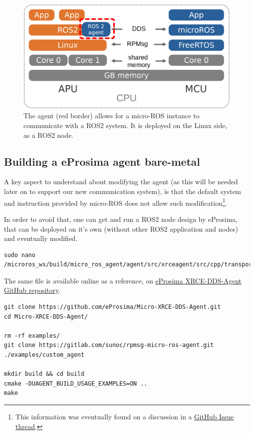\documentclass[10pt]{article}
\begin{document}
\begin{figure}[htbp]
\centering
\includegraphics[width=.6\textwidth]{./img/map_agent.png}
\caption{\label{fig:orgc8b10e5}The agent (red border) allows for a micro-ROS instance to communicate with a ROS2 system. It is deployed on the Linux side, as a ROS2 node.}
\end{figure}


\subsection{Building a eProsima agent bare-metal}
\label{sec:org2aa5f17}
A key aspect to understand about modifying the agent (as
this will be needed later on to support our new communication system),
is that the default system and instruction provided by micro-ROS does not
allow such modification\footnote{This information was eventually found on a discussion in a \href{https://github.com/micro-ROS/micro\_ros\_setup/issues/591}{GitHub Issue thread}.}.

In order to avoid that, one can get and run a ROS2 node design by eProsima,
that can be deployed on it's own (without other ROS2 application and nodes)
and eventually modified.


\begin{verbatim}
sudo nano /microros_ws/build/micro_ros_agent/agent/src/xrceagent/src/cpp/transport/custom/CustomAgent.cpp
\end{verbatim}
The same file is available online as a reference, on \href{https://github.com/eProsima/Micro-XRCE-DDS-Agent/blob/develop/src/cpp/transport/custom/CustomAgent.cpp}{eProsima XRCE-DDS-Agent GitHub repository}.


\begin{verbatim}
git clone https://github.com/eProsima/Micro-XRCE-DDS-Agent.git
cd Micro-XRCE-DDS-Agent/

rm -rf examples/
git clone https://gitlab.com/sunoc/rpmsg-micro-ros-agent.git ./examples/custom_agent

mkdir build && cd build
cmake -DUAGENT_BUILD_USAGE_EXAMPLES=ON ..
make
\end{verbatim}
\end{document}
